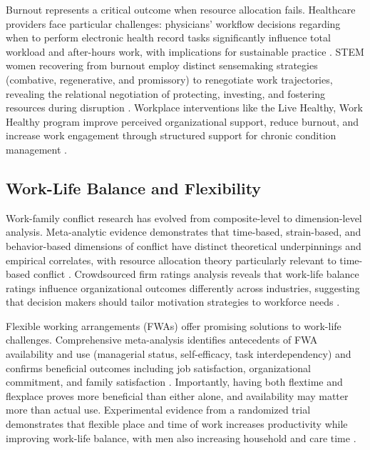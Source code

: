 Burnout represents a critical outcome when resource allocation fails. Healthcare providers face particular challenges: physicians' workflow decisions regarding when to perform electronic health record tasks significantly influence total workload and after-hours work, with implications for sustainable practice \citep{celik_frontiers_2024}. STEM women recovering from burnout employ distinct sensemaking strategies (combative, regenerative, and promissory) to renegotiate work trajectories, revealing the relational negotiation of protecting, investing, and fostering resources during disruption \citep{lee_beyond_2024}. Workplace interventions like the Live Healthy, Work Healthy program improve perceived organizational support, reduce burnout, and increase work engagement through structured support for chronic condition management \citep{haynes_evaluating_2021}.

\subsection{Work-Life Balance and Flexibility}

Work-family conflict research has evolved from composite-level to dimension-level analysis. Meta-analytic evidence demonstrates that time-based, strain-based, and behavior-based dimensions of conflict have distinct theoretical underpinnings and empirical correlates, with resource allocation theory particularly relevant to time-based conflict \citep{hetrick_theoretical_2023}. Crowdsourced firm ratings analysis reveals that work-life balance ratings influence organizational outcomes differently across industries, suggesting that decision makers should tailor motivation strategies to workforce needs \citep{liu_crowdsourced_2024}.

Flexible working arrangements (FWAs) offer promising solutions to work-life challenges. Comprehensive meta-analysis identifies antecedents of FWA availability and use (managerial status, self-efficacy, task interdependency) and confirms beneficial outcomes including job satisfaction, organizational commitment, and family satisfaction \citep{harrop_meta_2025}. Importantly, having both flextime and flexplace proves more beneficial than either alone, and availability may matter more than actual use. Experimental evidence from a randomized trial demonstrates that flexible place and time of work increases productivity while improving work-life balance, with men also increasing household and care time \citep{angelici_smart_2024}.

